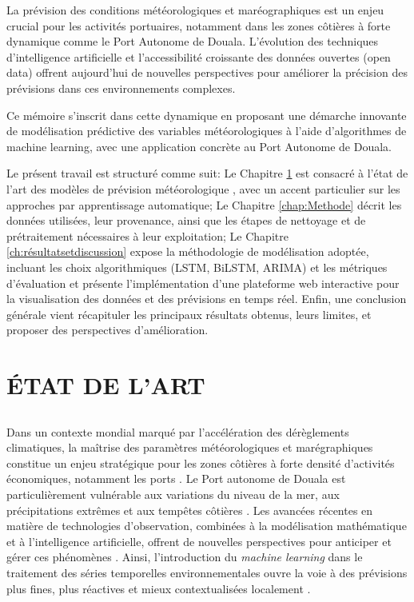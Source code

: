 \documentclass[a4paper,12pt,openany]{report}
\begin{document}
	La prévision des conditions météorologiques et maréographiques est un enjeu crucial pour les activités portuaires, notamment dans les zones côtières à forte dynamique comme le Port Autonome de Douala. L’évolution des techniques d’intelligence artificielle et l’accessibilité croissante des données ouvertes (open data) offrent aujourd’hui de nouvelles perspectives pour améliorer la précision des prévisions dans ces environnements complexes.
	
	Ce mémoire s’inscrit dans cette dynamique en proposant une démarche innovante de modélisation prédictive des variables météorologiques  à l’aide d’algorithmes de machine learning, avec une application concrète au Port Autonome de Douala.
	
	
\quad Le présent travail est structuré comme suit: Le Chapitre \ref{chap:Etat_Art} est consacré à l’état de l’art des modèles de prévision météorologique , avec un accent particulier sur les approches par apprentissage automatique; Le Chapitre \ref{chap:Methode} décrit les données utilisées, leur provenance, ainsi que les étapes de nettoyage et de prétraitement nécessaires à leur exploitation; Le Chapitre \ref{ch:résultatsetdiscussion} expose la méthodologie de modélisation adoptée, incluant les choix algorithmiques (LSTM, BiLSTM, ARIMA) et les métriques d’évaluation et  présente l’implémentation d’une plateforme web interactive pour la visualisation des données et des prévisions en temps réel. Enfin, une conclusion générale vient récapituler les principaux résultats obtenus, leurs limites, et proposer des perspectives d’amélioration.
	
	
	

    
\chapter{ÉTAT DE L'ART }
\label{chap:Etat_Art}	

		\section*{}
	

	 \quad Dans un contexte mondial marqué par l'accélération des dérèglements climatiques, la maîtrise des paramètres météorologiques et marégraphiques constitue un enjeu stratégique pour les zones côtières à forte densité d'activités économiques, notamment les ports \cite{Nicholls2008}. Le Port autonome de Douala est particulièrement vulnérable aux variations du niveau de la mer, aux précipitations extrêmes et aux tempêtes côtières \cite{Ngatcha2021}. Les avancées récentes en matière de technologies d'observation, combinées à la modélisation mathématique et à l'intelligence artificielle, offrent de nouvelles perspectives pour anticiper et gérer ces phénomènes \cite{Bremnes2020}. Ainsi, l'introduction du \textit{machine learning} dans le traitement des séries temporelles environnementales ouvre la voie à des prévisions plus fines, plus réactives et mieux contextualisées localement \cite{Shamshirband2020}.
	
\end{document}
